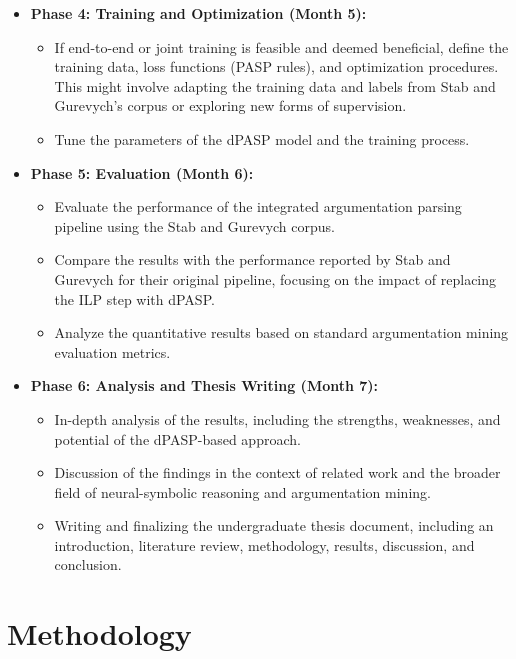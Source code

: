\documentclass{article}
\begin{document}
\begin{itemize}
    \item \textbf{Phase 4: Training and Optimization (Month 5):}
    \begin{itemize}
        \item If end-to-end or joint training is feasible and deemed beneficial,
        define the training data, loss functions (PASP rules), and optimization
        procedures.
        This might involve adapting the training data and labels from Stab and
        Gurevych's corpus or exploring new forms of supervision.
        \item Tune the parameters of the dPASP model and the training process.
    \end{itemize}

    \item \textbf{Phase 5: Evaluation (Month 6):}
    \begin{itemize}
        \item Evaluate the performance of the integrated argumentation parsing
        pipeline using the Stab and Gurevych corpus.
        \item Compare the results with the performance reported by Stab and
        Gurevych for their original pipeline, focusing on the impact of
        replacing the ILP step with dPASP.
        \item Analyze the quantitative results based on standard argumentation
        mining evaluation metrics.
    \end{itemize}

    \item \textbf{Phase 6: Analysis and Thesis Writing (Month 7):}
    \begin{itemize}
        \item In-depth analysis of the results, including the strengths,
        weaknesses, and potential of the dPASP-based approach.
        \item Discussion of the findings in the context of related work and the
        broader field of neural-symbolic reasoning and argumentation mining.
        \item Writing and finalizing the undergraduate thesis document,
        including an introduction, literature review, methodology, results,
        discussion, and conclusion.
    \end{itemize}
\end{itemize}

\section{Methodology}
\end{document}
